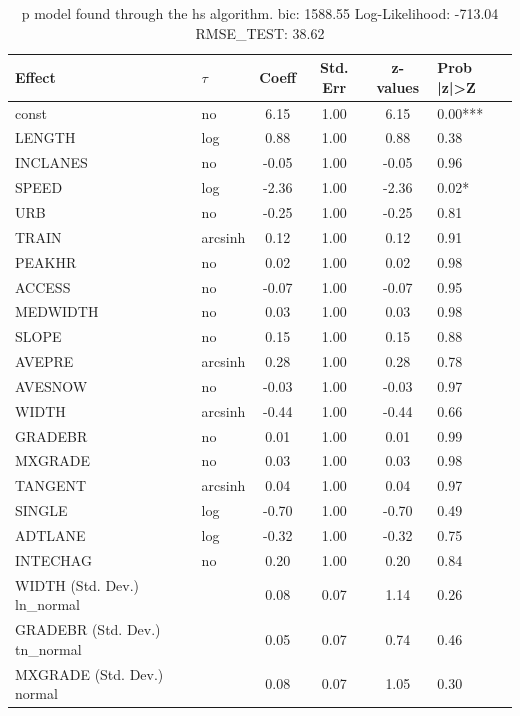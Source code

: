\begin{table}
	\caption{p model found through the hs algorithm. bic: 1588.55 Log-Likelihood: -713.04 RMSE_TEST: 38.62}
	\begin{center}
		\begin{tabular}{|l|l|c|c|c|l|}
			\hline
			Effect & $\tau$ & Coeff & Std. Err & z-values & Prob |z|>Z \\
			\hline
			const & no & 6.15 & 1.00 & 6.15 & 0.00*** \\
			\hline
			LENGTH & log & 0.88 & 1.00 & 0.88 & 0.38 \\
			\hline
			INCLANES & no & -0.05 & 1.00 & -0.05 & 0.96 \\
			\hline
			SPEED & log & -2.36 & 1.00 & -2.36 & 0.02* \\
			\hline
			URB & no & -0.25 & 1.00 & -0.25 & 0.81 \\
			\hline
			TRAIN & arcsinh & 0.12 & 1.00 & 0.12 & 0.91 \\
			\hline
			PEAKHR & no & 0.02 & 1.00 & 0.02 & 0.98 \\
			\hline
			ACCESS & no & -0.07 & 1.00 & -0.07 & 0.95 \\
			\hline
			MEDWIDTH & no & 0.03 & 1.00 & 0.03 & 0.98 \\
			\hline
			SLOPE & no & 0.15 & 1.00 & 0.15 & 0.88 \\
			\hline
			AVEPRE & arcsinh & 0.28 & 1.00 & 0.28 & 0.78 \\
			\hline
			AVESNOW & no & -0.03 & 1.00 & -0.03 & 0.97 \\
			\hline
			WIDTH & arcsinh & -0.44 & 1.00 & -0.44 & 0.66 \\
			\hline
			GRADEBR & no & 0.01 & 1.00 & 0.01 & 0.99 \\
			\hline
			MXGRADE & no & 0.03 & 1.00 & 0.03 & 0.98 \\
			\hline
			TANGENT & arcsinh & 0.04 & 1.00 & 0.04 & 0.97 \\
			\hline
			SINGLE & log & -0.70 & 1.00 & -0.70 & 0.49 \\
			\hline
			ADTLANE & log & -0.32 & 1.00 & -0.32 & 0.75 \\
			\hline
			INTECHAG & no & 0.20 & 1.00 & 0.20 & 0.84 \\
			\hline
			WIDTH (Std. Dev.) ln_normal &  & 0.08 & 0.07 & 1.14 & 0.26 \\
			\hline
			GRADEBR (Std. Dev.) tn_normal &  & 0.05 & 0.07 & 0.74 & 0.46 \\
			\hline
			MXGRADE (Std. Dev.) normal &  & 0.08 & 0.07 & 1.05 & 0.30 \\

\end{tabular}
\end{center}
\end{table}
